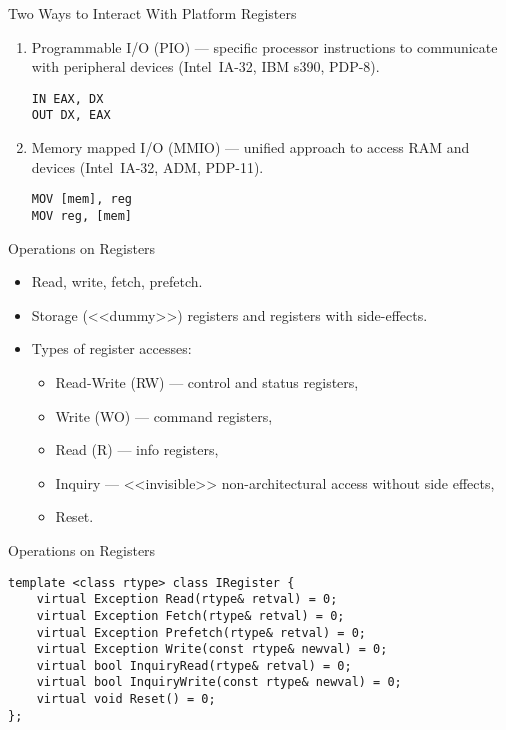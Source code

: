 \begin{frame}[fragile]{Two Ways to Interact With Platform Registers}
\begin{enumerate}
\item
Programmable I/O (PIO) --- specific processor instructions to communicate with
peripheral devices (Intel\reg~IA-32, IBM s390, PDP-8).
\vfill
\begin{verbatim}
IN EAX, DX
OUT DX, EAX
\end{verbatim}
\vfill\pause
\item
Memory mapped I/O (MMIO) --- unified approach to access RAM and devices
(Intel\reg~IA-32, ADM, PDP-11).
\vfill
\begin{verbatim}
MOV [mem], reg
MOV reg, [mem]
\end{verbatim}
\end{enumerate}
\end{frame}

\begin{frame}{Operations on Registers}
\begin{itemize}
\item Read, write, fetch, prefetch.
\item Storage (<<dummy>>) registers and registers with side-effects.
\item Types of register accesses:
\begin{itemize}
\item Read-Write (RW) --- control and status registers,
\item Write (WO) --- command registers,
\item Read (R) --- info registers,
\item Inquiry --- <<invisible>> non-architectural access without side effects,
\item Reset.
\end{itemize}
\end{itemize}
\end{frame}

\begin{frame}[fragile]{Operations on Registers}
\begin{lstlisting}[basicstyle=\small]
template <class rtype> class IRegister {
    virtual Exception Read(rtype& retval) = 0;
    virtual Exception Fetch(rtype& retval) = 0;
    virtual Exception Prefetch(rtype& retval) = 0;
    virtual Exception Write(const rtype& newval) = 0;
    virtual bool InquiryRead(rtype& retval) = 0;
    virtual bool InquiryWrite(const rtype& newval) = 0;
    virtual void Reset() = 0;
};
\end{lstlisting}
\end{frame}

